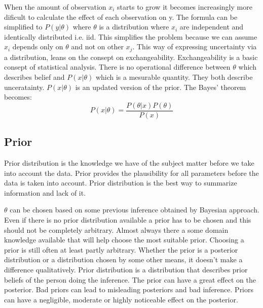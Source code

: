 When the amount of observation $x_i$ starts to grow it becomes increasingly more dificult to calculate the effect of each observation on y. The formula can be simplified to $P(y|\theta)$ where $\theta$ is a distribution where $x_i$ are independent and identically distributed i.e. iid. This simplifies the problem because we can assume $x_i$ depends only on $\theta$ and not on other $x_j$.\cite{Lindley1990The1W} This way of expressing uncertainty via a distribution, leans on the consept on exchangeability. Exchangeability is a basic consept of statistical analysis. \cite{Gel2014BayesianDA}  There is no operational difference between $\theta$ which describes belief and $P(x|\theta)$ which is a mesurable quantity. They both describe unceratainty. $P(x|\theta)$ is an updated version of the prior. The Bayes' theorem becomes: 
\begin{equation}
P(x|\theta) = \frac{P(\theta|x)P(\theta)}{P(x)}
\end{equation}
\cite{Pawitan2002InAL}

\subsection{Prior}\label{Prior}
Prior distribution is the knowledge we have of the subject matter before we take into account the data.\cite{Box1973BayesianII} Prior provides the plausibility for all parameters before the data is taken into account. \cite{Mcelreath2015StatisticalRA}\cite{Robert2007TheBC} Prior distribution is the best way to summarize information and lack of it.\cite{Robert2007TheBC} 

$\theta$ can be chosen based on some previous inference obtained by Bayesian approach. Even if there is no prior distribution available a prior has to be chosen and this should not be completely arbitrary. Almost always there a some domain knowledge available that will help choose the most suitable prior.\cite{Mcelreath2015StatisticalRA} Choosing a prior is still often at least partly arbitrary.\cite{Robert2007TheBC} Whether the prior is a posterior distribution or a distribution chosen by some other means, it doesn't make a difference qualitatively. Prior distribution is a distribution that describes prior beliefs of the person doing the inference.\cite{Lindley1990The1W} The prior can have a great effect on the posterior. Bad priors can lead to misleading posteriors and bad inference.\cite{Mcelreath2015StatisticalRA} Priors can have a negligible, moderate or highly noticeable effect on the posterior.\cite{Robert2007TheBC}

